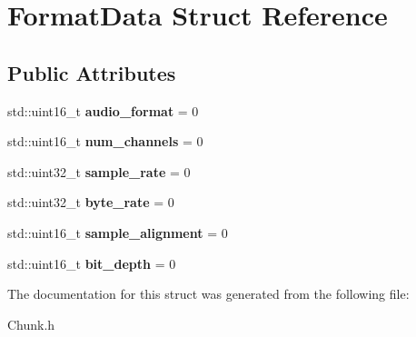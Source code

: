 \hypertarget{structFormatData}{}\section{Format\+Data Struct Reference}
\label{structFormatData}
\subsection*{Public Attributes}
\begin{DoxyCompactItemize}
\item 
\mbox{\label{structFormatData_ae9b5992de4243de919423e228e599486}} 
std\+::uint16\+\_\+t {\bfseries audio\+\_\+format} = 0
\item 
\mbox{\label{structFormatData_afde4562d7319acea769dd550f6974169}} 
std\+::uint16\+\_\+t {\bfseries num\+\_\+channels} = 0
\item 
\mbox{\label{structFormatData_a4484a2e63b02fc0d80a30714941b763a}} 
std\+::uint32\+\_\+t {\bfseries sample\+\_\+rate} = 0
\item 
\mbox{\label{structFormatData_a91d6a9b80b0fadb7a84884d2e76e8b08}} 
std\+::uint32\+\_\+t {\bfseries byte\+\_\+rate} = 0
\item 
\mbox{\label{structFormatData_aa09990b7ed9702a95dac2642c29535c7}} 
std\+::uint16\+\_\+t {\bfseries sample\+\_\+alignment} = 0
\item 
\mbox{\label{structFormatData_aa2c229f06a76e60570cd6829082a3409}} 
std\+::uint16\+\_\+t {\bfseries bit\+\_\+depth} = 0
\end{DoxyCompactItemize}


The documentation for this struct was generated from the following file\+:\begin{DoxyCompactItemize}
\item 
Chunk.\+h\end{DoxyCompactItemize}
